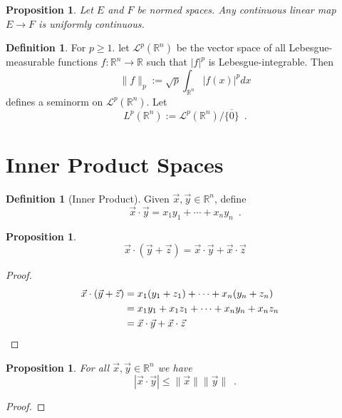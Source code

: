 \documentclass{book}
\let\qed\relax
\newtheorem{prop}[ax]{Proposition}
\theoremstyle{definition}
\newtheorem{df}[ax]{Definition}
\begin{document}
\begin{prop}
Let $E$ and $F$ be normed spaces. Any continuous linear map $E \rightarrow F$ is uniformly continuous.
\end{prop}

\begin{df}
For $p \geq 1$. let $\mathcal{L}^p(\mathbb{R}^n)$ be the vector space of all Lebesgue-measurable functions $f : \mathbb{R}^n \rightarrow \mathbb{R}$ such that $|f|^p$ is Lebesgue-integrable. Then
\[ \| f \|_p := \sqrt{p}{\int_{\mathbb{R}^n} |f(x)|^p dx} \]
defines a seminorm on $\mathcal{L}^p(\mathbb{R}^n)$. Let
\[ L^p(\mathbb{R}^n) := \mathcal{L}^p(\mathbb{R}^n) / \overline{\{0\}} \enspace . \]
\end{df}

\section{Inner Product Spaces}

\begin{df}[Inner Product]
Given $\vec{x}, \vec{y} \in \mathbb{R}^n$, define
\[ \vec{x} \cdot \vec{y} = x_1 y_1 + \cdots + x_n y_n \enspace . \]
\end{df}

\begin{prop}
\[ \vec{x} \cdot (\vec{y} + \vec{z}) = \vec{x} \cdot \vec{y} + \vec{x} \cdot \vec{z} \]
\end{prop}

\begin{proof}
\pf
\begin{align*}
	\vec{x} \cdot (\vec{y} + \vec{z}) & = x_1 (y_1 + z_1) + \cdots + x_n (y_n + z_n) \\
	& = x_1 y_1 + x_1 z_1 + \cdots + x_n y_n + x_n z_n \\
	& = \vec{x} \cdot \vec{y} + \vec{x} \cdot \vec{z} & \qed
\end{align*}
\end{proof}

\begin{prop}
\label{prop:dot_leq_norms}
For all $\vec{x}, \vec{y} \in \mathbb{R}^n$ we have
\[ | \vec{x} \cdot \vec{y} | \leq \| \vec{x} \| \| \vec{y} \| \enspace . \]
\end{prop}

\begin{proof}
\pf
{}
\qed
\end{proof}
\end{document}
